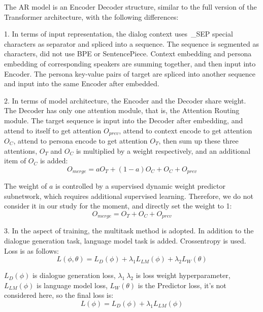 \documentclass[letterpaper]{article} %
\DeclareRobustCommand{\citeext}[1]{\cite[#1]{#1}}
\begin{document}
The AR model is an Encoder Decoder structure, similar to the full version of the Transformer architecture\citeext{Vaswani2017}, with the following differences: 

1. In terms of input representation, the dialog context uses~\_SEP special characters as separator and spliced into a sequence. The sequence is segmented as characters, did not use BPE or SentencePiece. Context embedding and persona embedding of corresponding speakers are summing together, and then input into Encoder. The persona key-value pairs of target are spliced into another sequence and input into the same Encoder after embedded. 

2. In terms of model architecture, the Encoder and the Decoder share weight. The Decoder has only one attention module, that is, the Attention Routing module. The target sequence is input into the Decoder after embedding, and attend to itself to get attention $O_{prev}$, attend to context encode to get attention $O_C$, attend to persona encode to get attention $O_T$, then sum up these three attentions, $O_T$ and $O_C$ is multiplied by a weight respectively, and an additional item of $O_C$ is added: 
\begin{equation}
O_{merge} = aO_T + (1 - a)O_C + O_C + O_{prev}    
\end{equation}

The weight of $a$ is controlled by a supervised dynamic weight predictor subnetwork, which requires additional supervised learning. Therefore, we do not consider it in our study for the moment, and directly set the weight to 1: 
\begin{equation}
O_{merge} = O_T + O_C + O_{prev}    
\end{equation}

3. In the aspect of training, the multitask method is adopted. In addition to the dialogue generation task, language model task is added. Crossentropy is used. Loss is as follows: 
\begin{equation}
L(\phi, \theta) = L_D(\phi) + \lambda_1L_{LM}(\phi) + \lambda_2L_W(\theta)
\end{equation}

$L_D(\phi)$ is dialogue generation loss, $\lambda_1~\lambda_2$ is loss weight hyperparameter, $L_{LM}(\phi)$ is language model loss, $L_W(\theta)$ is the Predictor loss, it's not considered here, so the final loss is:
\begin{equation}
L(\phi) = L_D(\phi) + \lambda_1L_{LM}(\phi)
\end{equation}
\end{document}
